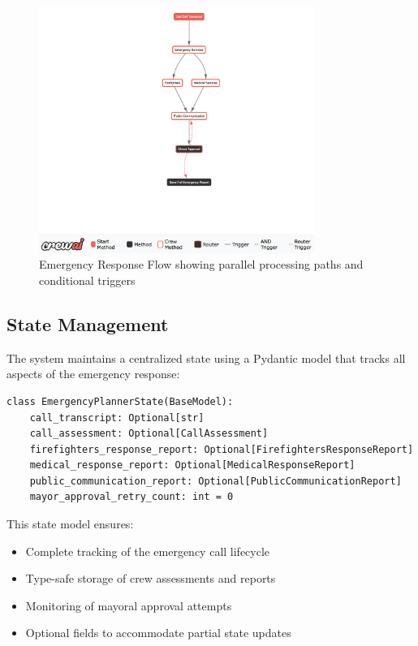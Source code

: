 \begin{figure}[ht!]
\centering
\includegraphics[width=0.8\textwidth]{figures/coordination_flow.png}
\caption{Emergency Response Flow showing parallel processing paths and conditional triggers}
\label{fig:interaction}
\end{figure}

\subsection{State Management}
The system maintains a centralized state using a Pydantic model that tracks all aspects of the emergency response:

\begin{lstlisting}[caption={Emergency Planner State Model}]
class EmergencyPlannerState(BaseModel):
    call_transcript: Optional[str]
    call_assessment: Optional[CallAssessment]
    firefighters_response_report: Optional[FirefightersResponseReport]
    medical_response_report: Optional[MedicalResponseReport]
    public_communication_report: Optional[PublicCommunicationReport]
    mayor_approval_retry_count: int = 0
\end{lstlisting}

This state model ensures:
\begin{itemize}
    \item Complete tracking of the emergency call lifecycle
    \item Type-safe storage of crew assessments and reports
    \item Monitoring of mayoral approval attempts
    \item Optional fields to accommodate partial state updates
\end{itemize}

